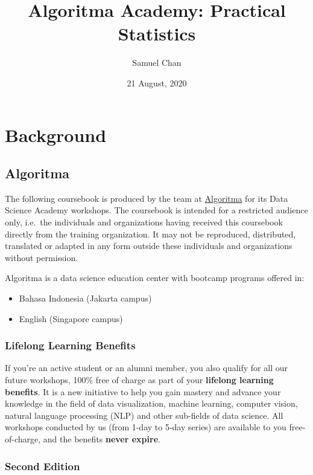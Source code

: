 \documentclass[]{article}
\title{Algoritma Academy: Practical Statistics}
\author{Samuel Chan}
\date{21 August, 2020}
\providecommand{\tightlist}{%
  \setlength{\itemsep}{0pt}\setlength{\parskip}{0pt}}
\begin{document}
\maketitle

\hypertarget{background}{%
\section{Background}\label{background}}

\hypertarget{algoritma}{%
\subsection{Algoritma}\label{algoritma}}

The following coursebook is produced by the team at
\href{https://algorit.ma}{Algoritma} for its Data Science Academy
workshops. The coursebook is intended for a restricted audience only,
i.e.~the individuals and organizations having received this coursebook
directly from the training organization. It may not be reproduced,
distributed, translated or adapted in any form outside these individuals
and organizations without permission.

Algoritma is a data science education center with bootcamp programs
offered in:

\begin{itemize}
\tightlist
\item
  Bahasa Indonesia (Jakarta campus)\\
\item
  English (Singapore campus)
\end{itemize}

\hypertarget{lifelong-learning-benefits}{%
\subsubsection{Lifelong Learning
Benefits}\label{lifelong-learning-benefits}}

If you're an active student or an alumni member, you also qualify for
all our future workshops, 100\% free of charge as part of your
\textbf{lifelong learning benefits}. It is a new initiative to help you
gain mastery and advance your knowledge in the field of data
visualization, machine learning, computer vision, natural language
processing (NLP) and other sub-fields of data science. All workshops
conducted by us (from 1-day to 5-day series) are available to you
free-of-charge, and the benefits \textbf{never expire}.

\hypertarget{second-edition}{%
\subsubsection{Second Edition}\label{second-edition}}
\end{document}

